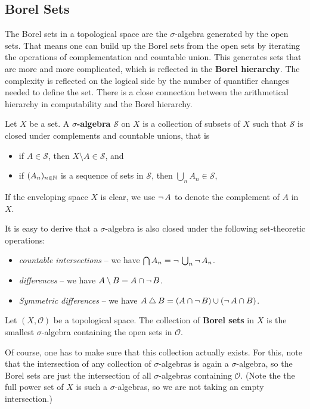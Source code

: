 \subsection{Borel Sets}

The Borel sets in a topological space are the $\sigma$-algebra generated by the open sets. That means one can build up the Borel sets from the open sets by iterating the operations of complementation and countable union. This generates sets that are more and more complicated, which is reflected in the \textbf{Borel hierarchy}. The complexity is reflected on the logical side by the number of quantifier changes needed to define the set. There is a close connection between the arithmetical hierarchy in computability and the Borel hierarchy.

\begin{definition}\label{def-borel}Let $X$ be a set. A \textbf{$\sigma$-algebra} $\mathcal{S}$ on $X$ is a collection of subsets of $X$ such that $\mathcal{S}$ is closed under complements and countable unions, that is

\begin{itemize}
\item if $A \in \mathcal{S}$, then $X \setminus A \in \mathcal{S}$, and
\item if $(A_n)_{n \in \mathbb{N}}$ is a sequence of sets in $\mathcal{S}$, then $\bigcup_n A_n \in \mathcal{S}$,
\end{itemize}

\end{definition}If the enveloping space $X$ is clear, we use $\neg \, A$ to denote the complement of $A$ in $X$.

It is easy to derive that a $\sigma$-algebra is also closed under the following set-theoretic operations:

\begin{itemize}
\item \textit{countable intersections} -- we have $\bigcap A_n = \neg \, \bigcup_n \neg \, A_n$.
\item \textit{differences} -- we have $A \setminus B = A \cap \neg \, B$.
\item \textit{Symmetric differences} -- we have $A \bigtriangleup B = (A \cap \neg \, B) \cup (\neg \, A \cap B)$.
\end{itemize}

\begin{definition}Let $(X,\mathcal{O})$ be a topological space. The collection of \textbf{Borel sets} in $X$ is the smallest $\sigma$-algebra containing the open sets in $\mathcal{O}$.

\end{definition}Of course, one has to make sure that this collection actually exists. For this, note that the intersection of any collection of $\sigma$-algebras is again a $\sigma$-algebra, so the Borel sets are just the intersection of all $\sigma$-algebras containing $\mathcal{O}$. (Note the the full power set of $X$ is such a $\sigma$-algebras, so we are not taking an empty intersection.)

